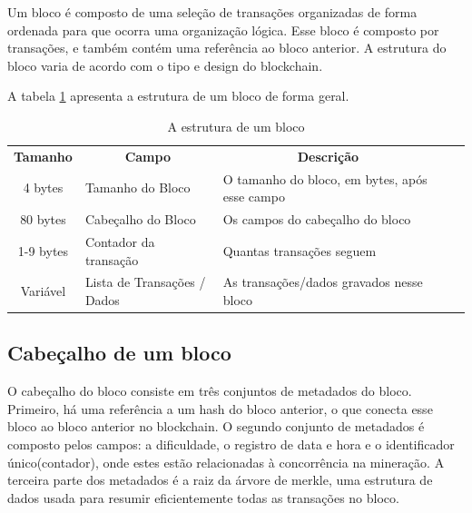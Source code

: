         Um bloco é composto de uma seleção de transações organizadas de forma ordenada para que ocorra uma organização lógica. Esse bloco é composto por transações, e também contém uma referência ao bloco anterior. A estrutura do bloco varia de acordo com o tipo e design do blockchain.\cite{mastering_blockchain}
        
        A tabela \ref{tabela_estrutura_de_um_bloco} apresenta a estrutura de um bloco de forma geral.
        
  
        \begin{table}[H]
            \begin{tabular}{|c|l|l|ll}
            \cline{1-3}
            \cellcolor[HTML]{9AFF99}\textbf{Tamanho} & \multicolumn{1}{c|}{\cellcolor[HTML]{9AFF99}\textbf{Campo}} & \multicolumn{1}{c|}{\cellcolor[HTML]{9AFF99}\textbf{Descrição}} &  &  \\ \cline{1-3}
            4 bytes                                  & Tamanho do Bloco                                            & O tamanho do bloco, em bytes, após esse campo                   &  &  \\ \cline{1-3}
            80 bytes                                 & Cabeçalho do Bloco                                          & Os campos do cabeçalho do bloco                                 &  &  \\ \cline{1-3}
            1-9 bytes                                & Contador da transação                                       & Quantas transações seguem                                       &  &  \\ \cline{1-3}
            Variável                                 & Lista de Transações / Dados                                 & As transações/dados gravados nesse bloco                              &  &  \\ \cline{1-3}
            \end{tabular}
        \caption{A estrutura de um bloco}
        \label{tabela_estrutura_de_um_bloco}
        \end{table}
            
    \subsection{Cabeçalho de um bloco}

    O cabeçalho do bloco consiste em três conjuntos de metadados do bloco. Primeiro, há uma referência a um hash do bloco anterior, o que conecta esse bloco ao bloco anterior no blockchain. O segundo conjunto de metadados é composto pelos campos: a dificuldade, o registro de data e hora e o identificador único(contador), onde estes estão relacionadas à concorrência na mineração. A terceira parte dos metadados é a raiz da árvore de merkle, uma estrutura de dados usada para resumir eficientemente todas as transações no bloco.\cite{mastering_blockchain_andreas}

